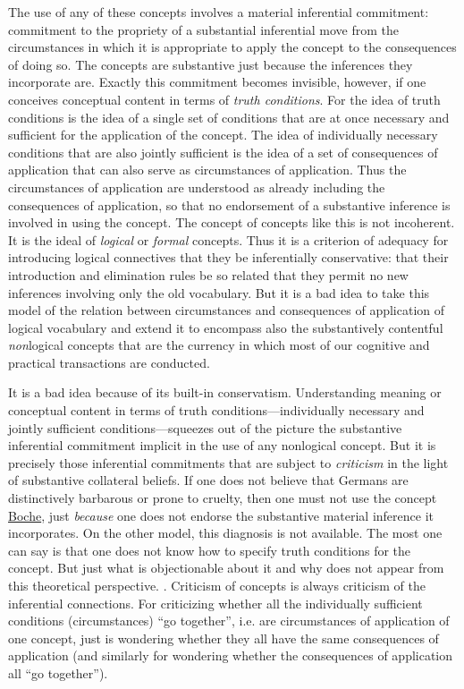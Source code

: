 The use of any of these concepts involves a material inferential
commitment: commitment to the propriety of a substantial inferential
move from the circumstances in which it is appropriate to apply the
concept to the consequences of doing so. The concepts are substantive
just because the inferences they incorporate are. Exactly this
commitment becomes invisible, however, if one conceives conceptual
content in terms of \emph{truth conditions}. For the idea of truth
conditions is the idea of a single set of conditions that are at once
necessary and sufficient for the application of the concept. The idea of
individually necessary conditions that are also jointly sufficient is
the idea of a set of consequences of application that can also serve as
circumstances of application. Thus the circumstances of application are
understood as already including the consequences of application, so that
no endorsement of a substantive inference is involved in using the
concept. The concept of concepts like this is not incoherent. It is the
ideal of \emph{logical} or \emph{formal} concepts. Thus it is a
criterion of adequacy for introducing logical connectives that they be
inferentially conservative: that their introduction and elimination
rules be so related that they permit no new inferences involving only
the old vocabulary. But it is a bad idea to take this model of the
relation between circumstances and consequences of application of
logical vocabulary and extend it to encompass also the substantively
contentful \emph{non}logical concepts that are the currency in which
most of our cognitive and practical transactions are conducted.

It is a bad idea because of its built-in conservatism. Understanding
meaning or conceptual content in terms of truth
conditions---individually necessary and jointly sufficient
conditions---squeezes out of the picture the substantive inferential
commitment implicit in the use of any nonlogical concept. But it is
precisely those inferential commitments that are subject to
\emph{criticism} in the light of substantive collateral beliefs. If one
does not believe that Germans are distinctively barbarous or prone to
cruelty, then one must not use the concept \underline{Boche}, just
\emph{because} one does not endorse the substantive material inference
it incorporates. On the other model, this diagnosis is not available.
The most one can say is that one does not know how to specify truth
conditions for the concept. But just what is objectionable about it and
why does not appear from this theoretical perspective. . Criticism of
concepts is always criticism of the inferential connections. For
criticizing whether all the individually sufficient conditions
(circumstances) ``go together'', i.e. are circumstances of application
of one concept, just is wondering whether they all have the same
consequences of application (and similarly for wondering whether the
consequences of application all ``go together'').

